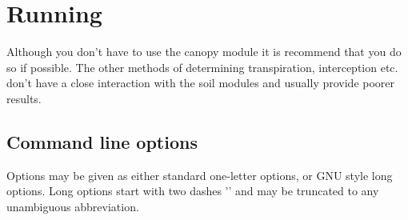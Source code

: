 \chapter{Running \vamps}
Although you don't have to use the canopy module it is recommend that
you do so if possible. The other methods of determining transpiration,
interception etc. don't have a close interaction with the soil modules
and usually provide poorer results.


\section{Command line options}
Options may be given as either standard one-letter options, or GNU style
long options. Long options start with two dashes '\-\-' and may be truncated
to any unambiguous abbreviation.

